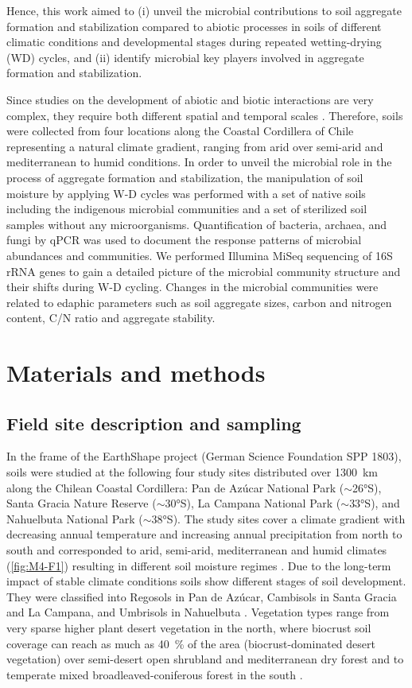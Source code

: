 Hence, this work aimed to (i) unveil the microbial contributions to soil aggregate formation and stabilization compared to abiotic processes in soils of different climatic conditions and developmental stages during repeated wetting-drying (WD) cycles, and (ii) identify microbial key players involved in aggregate formation and stabilization.

Since studies on the development of abiotic and biotic interactions are very complex, they require both different spatial and temporal scales \citep{Ollivier2011}. Therefore, soils were collected from four locations along the Coastal Cordillera of Chile representing a natural climate gradient, ranging from arid over semi-arid and mediterranean to humid conditions. In order to unveil the microbial role in the process of aggregate formation and stabilization, the manipulation of soil moisture by applying W-D cycles was performed with a set of native soils including the indigenous microbial communities and a set of sterilized soil samples without any microorganisms. Quantification of bacteria, archaea, and fungi by qPCR was used to document the response patterns of microbial abundances and communities. We performed Illumina MiSeq sequencing of 16S rRNA genes to gain a detailed picture of the microbial community structure and their shifts during W-D cycling. Changes in the microbial communities were related to edaphic parameters such as soil aggregate sizes, carbon and nitrogen content, C/N ratio and aggregate stability.

\section{Materials and methods}
\subsection{Field site description and sampling}

In the frame of the EarthShape project (German Science Foundation SPP 1803), soils were studied at the following four study sites distributed over \SI{1300}{\kilo\metre} along the Chilean Coastal Cordillera: Pan de Az{\'u}car National Park (\(\sim\)\ang{26}S), Santa Gracia Nature Reserve (\(\sim\)\ang{30}S), La Campana National Park (\(\sim\)\ang{33}S), and Nahuelbuta National Park (\(\sim\)\ang{38}S). The study sites cover a climate gradient with decreasing annual temperature and increasing annual precipitation from north to south and corresponded to arid, semi-arid, mediterranean and humid climates (\ref{fig:M4-F1}) resulting in different soil moisture regimes \citep{Bernhard2018}. Due to the long-term impact of stable climate conditions \citep{Ewing2006} soils show different stages of soil development. They were classified into Regosols in Pan de Az{\'u}car, Cambisols in Santa Gracia and La Campana, and Umbrisols in Nahuelbuta \citep{Bernhard2018}. Vegetation types range from very sparse higher plant desert vegetation in the north, where biocrust soil coverage can reach as much as \SI{40}{\percent} of the area (biocrust-dominated desert vegetation) over semi-desert open shrubland and mediterranean dry forest and to temperate mixed broadleaved-coniferous forest in the south \citep{Bernhard2018a, Bernhard2018}.


